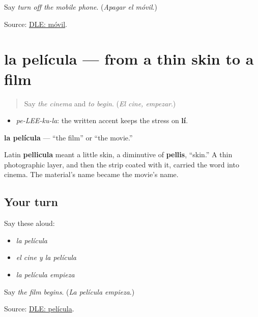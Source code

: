 \begin{tcolorbox}[breakable,colback=teal!4,colframe=teal!35!black,title={Before you move on}]
Say \emph{turn off the mobile phone}. (\emph{Apagar el móvil}.)

Source: \href{https://dle.rae.es/m\%C3\%B3vil}{DLE: móvil}.
\end{tcolorbox}
\section[la película]{la película — from a thin skin to a film}

\label{lesson:ES-C404-pelicula}



\begin{quote}
Say \emph{the cinema} and \emph{to begin}. (\emph{El cine, empezar}.)
\end{quote}

\begin{sounds}
\begin{itemize}
\raggedright
  \item \emph{pe-LEE-ku-la}: the written accent keeps the stress on \textbf{lí}.
\end{itemize}
\end{sounds}

\begin{cousinweb}
\textbf{la película} — “the film” or “the movie.”

Latin \textbf{pellicula} meant a little skin, a diminutive of \textbf{pellis}, “skin.” A thin photographic layer, and then the strip coated with it, carried the word into cinema. The material's name became the movie's name.
\end{cousinweb}

\subsection*{Your turn}
Say these aloud:

\begin{itemize}
\raggedright
  \item \emph{la película}
  \item \emph{el cine y la película}
  \item \emph{la película empieza}
\end{itemize}

\begin{tcolorbox}[breakable,colback=teal!4,colframe=teal!35!black,title={Before you move on}]
Say \emph{the film begins}. (\emph{La película empieza}.)

Source: \href{https://dle.rae.es/pel\%C3\%ADcula}{DLE: película}.
\end{tcolorbox}
